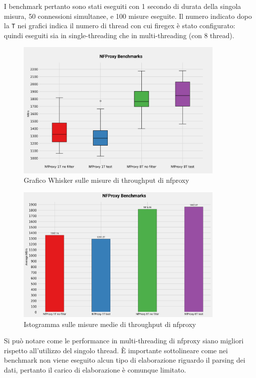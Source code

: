 I benchmark pertanto sono stati eseguiti con 1 secondo di durata della singola misura, 50 connessioni simultanee, e 100 misure eseguite. Il numero indicato dopo la \texttt{T} nei grafici indica il numero di thread con cui firegex è stato configurato: quindi eseguiti sia in single-threading che in multi-threading (con 8 thread).

\begin{figure}[H]
    \centering
    \includegraphics[width=0.90\textwidth]{images/chapter4/whisker_nfproxy.png}
    \caption{Grafico Whisker sulle misure di throughput di nfproxy}\label{fig:wisker_nfproxy}
\end{figure}

\begin{figure}[H]
    \centering
    \includegraphics[width=0.90\textwidth]{images/chapter4/istogramma_nfproxy.png}
    \caption{Istogramma sulle misure medie di throughput di nfproxy}\label{fig:istogramma_nfproxy}
\end{figure}

Si può notare come le performance in multi-threading di nfproxy siano migliori rispetto all'utilizzo del singolo thread. È importante sottolineare come nei benchmark non viene eseguito alcun tipo di elaborazione riguardo il parsing dei dati, pertanto il carico di elaborazione è comunque limitato.\\

